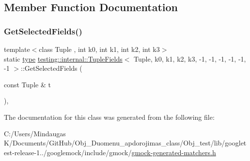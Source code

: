 \subsection{Member Function Documentation}
\mbox{\label{classtesting_1_1internal_1_1_tuple_fields_3_01_tuple_00_01k0_00_01k1_00_01k2_00_01k3_00_01-1_00_d404aa1c50b4758daf5bb2f78d0fb44c_ab425de0d7d5a7f13894b5e52ad8b553a}} 
\subsubsection{\texorpdfstring{GetSelectedFields()}{GetSelectedFields()}}
{\footnotesize\ttfamily template$<$class Tuple , int k0, int k1, int k2, int k3$>$ \\
static \mbox{\hyperlink{classtesting_1_1internal_1_1_tuple_fields_3_01_tuple_00_01k0_00_01k1_00_01k2_00_01k3_00_01-1_00_d404aa1c50b4758daf5bb2f78d0fb44c_a543de8075300fc9ee1b9f3494d492fb5}{type}} \mbox{\hyperlink{classtesting_1_1internal_1_1_tuple_fields}{testing\+::internal\+::\+Tuple\+Fields}}$<$ Tuple, k0, k1, k2, k3, -\/1, -\/1, -\/1, -\/1, -\/1, -\/1 $>$\+::Get\+Selected\+Fields (\begin{DoxyParamCaption}\item[{const Tuple \&}]{t }\end{DoxyParamCaption})\hspace{0.3cm}{\ttfamily [inline]}, {\ttfamily [static]}}



The documentation for this class was generated from the following file\+:\begin{DoxyCompactItemize}
\item 
C\+:/\+Users/\+Mindaugas K/\+Documents/\+Git\+Hub/\+Obj\+\_\+\+Duomenu\+\_\+apdorojimas\+\_\+class/\+Obj\+\_\+test/lib/googletest-\/release-\/1../googlemock/include/gmock/\mbox{\hyperlink{_obj__test_2lib_2googletest-release-1_88_81_2googlemock_2include_2gmock_2gmock-generated-matchers_8h}{gmock-\/generated-\/matchers.\+h}}\end{DoxyCompactItemize}
